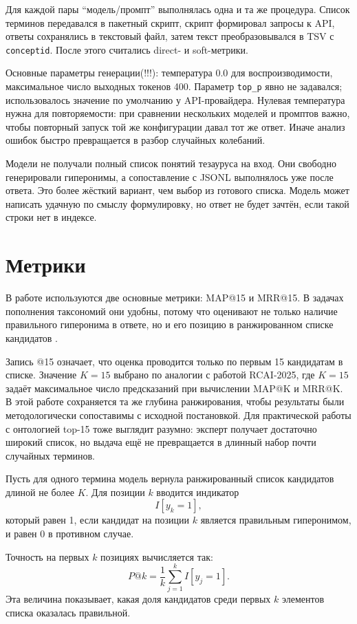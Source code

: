 \documentclass[12pt,a4paper,oneside,openany]{report}
\begin{document}
Для каждой пары ``модель/промпт'' выполнялась одна и та же процедура. Список терминов передавался в пакетный скрипт, скрипт формировал запросы к API, ответы сохранялись в текстовый файл, затем текст преобразовывался в TSV с \texttt{conceptid}. После этого считались direct- и soft-метрики.

Основные параметры генерации(!!!): температура 0.0 для воспроизводимости, максимальное число выходных токенов 400. Параметр \texttt{top\_p} явно не задавался; использовалось значение по умолчанию у API-провайдера. Нулевая температура нужна для повторяемости: при сравнении нескольких моделей и промптов важно, чтобы повторный запуск той же конфигурации давал тот же ответ. Иначе анализ ошибок быстро превращается в разбор случайных колебаний.

Модели не получали полный список понятий тезауруса на вход. Они свободно генерировали гиперонимы, а сопоставление с JSONL выполнялось уже после ответа. Это более жёсткий вариант, чем выбор из готового списка. Модель может написать удачную по смыслу формулировку, но ответ не будет зачтён, если такой строки нет в индексе.

\chapter{Метрики}

В работе используются две основные метрики: MAP@15 и MRR@15. В задачах пополнения таксономий они удобны, потому что оценивают не только наличие правильного гиперонима в ответе, но и его позицию в ранжированном списке кандидатов \cite{rcai2025,nikishina2022}.

Запись @15 означает, что оценка проводится только по первым 15 кандидатам в списке. Значение $K = 15$ выбрано по аналогии с работой RCAI-2025, где $K = 15$ задаёт максимальное число предсказаний при вычислении MAP@K и MRR@K. В этой работе сохраняется та же глубина ранжирования, чтобы результаты были методологически сопоставимы с исходной постановкой. Для практической работы с онтологией top-15 тоже выглядит разумно: эксперт получает достаточно широкий список, но выдача ещё не превращается в длинный набор почти случайных терминов.

Пусть для одного термина модель вернула ранжированный список кандидатов длиной не более $K$. Для позиции $k$ вводится индикатор
\[
I[y_k = 1],
\]
который равен 1, если кандидат на позиции $k$ является правильным гиперонимом, и равен 0 в противном случае.

Точность на первых $k$ позициях вычисляется так:
\[
P@k = \frac{1}{k}\sum_{j=1}^{k} I[y_j = 1].
\]
Эта величина показывает, какая доля кандидатов среди первых $k$ элементов списка оказалась правильной.
\end{document}
